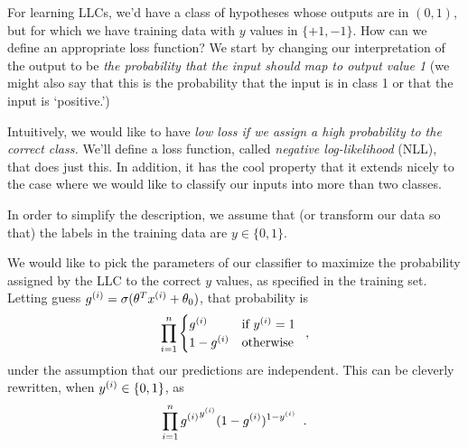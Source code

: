 For learning LLCs, we'd have a class of hypotheses
whose outputs are in $(0, 1)$, but for which we have training data with $y$
values in $\{+1, -1\}$.  How can we define an appropriate loss
function?  We start by changing our interpretation of the output to be
  {\em the probability that the input should map to output value 1} (we
might also say that this is the probability that the input is in class 1 or
that the input is `positive.')

Intuitively, we would like to have
  {\em low loss if we assign a high probability to the correct class.}
We'll define a loss function, called {\em negative log-likelihood} (NLL),
that does just this.  In  addition, it has the cool property that it
extends nicely to the case where we would like to classify our inputs
into more than two classes.

In order to simplify the description, we assume that (or transform our
data so that) the labels
in the training data are $y \in \{0, 1\}$.%

We would like to pick the parameters of our classifier to maximize the
probability assigned by the LLC to the correct $y$ values, as
specified in the training set.  Letting guess $g^{(i)} =
  \sigma(\theta^Tx^{(i)} + \theta_0)$,
that probability is
\begin{equation*}
  \prod_{i = 1}^n \begin{cases} g^{(i)} & \text{if $y^{(i)} =
              1$}                               \\ 1 - g^{(i)} & \text{otherwise}
  \end{cases}\;\;,
\end{equation*}
under the assumption that our predictions are independent.  This can
be cleverly rewritten, when $y^{(i)} \in \{0, 1\}$, as
\begin{equation*}
  \prod_{i = 1}^n {g^{(i)}}^{y^{(i)}}(1 - g^{(i)})^{1 - y^{(i)}}\;\;.
\end{equation*}

